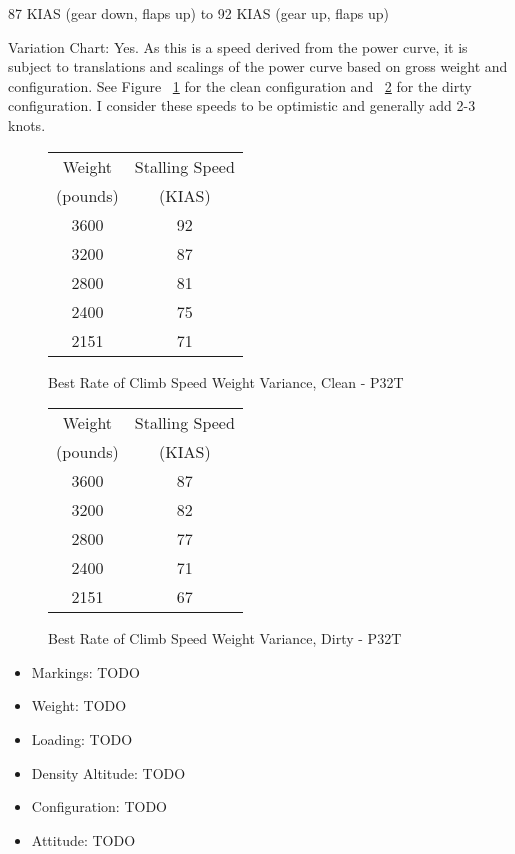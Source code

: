 87 KIAS (gear down, flaps up) to 92 KIAS (gear up, flaps up)

Variation Chart: Yes. As this is a speed derived from the power curve, it is subject to translations and scalings of the power curve based on gross weight and configuration. See Figure ~\ref{fig:VYCleanP32T} for the clean configuration and ~\ref{fig:VYDirtyP32T} for the dirty configuration. I consider these speeds to be optimistic and generally add 2-3 knots.

\begin{figure}
\begin{center}
\begin{tabular}{ |c|c| }
    \hline
    Weight & Stalling Speed \\
    (pounds) & (KIAS) \\
    \hline
     3600 &  92 \\
     3200 &  87 \\
    \hline
     2800 &  81 \\
     2400 &  75 \\
    \hline
     2151 &  71 \\
    \hline
\end{tabular}
\end{center}
\caption{Best Rate of Climb Speed Weight Variance, Clean - P32T}
\label{fig:VYCleanP32T}
\end{figure}

\begin{figure}
\begin{center}
\begin{tabular}{ |c|c| }
    \hline
    Weight & Stalling Speed \\
    (pounds) & (KIAS) \\
    \hline
     3600 &  87 \\
     3200 &  82 \\
    \hline
     2800 &  77 \\
     2400 &  71 \\
    \hline
     2151 &  67 \\
    \hline
\end{tabular}
\end{center}
\caption{Best Rate of Climb Speed Weight Variance, Dirty - P32T}
\label{fig:VYDirtyP32T}
\end{figure}

\begin{itemize}
\item Markings: TODO
\item Weight: TODO
\item Loading: TODO
\item Density Altitude: TODO
\item Configuration: TODO
\item Attitude: TODO
\end{itemize}

